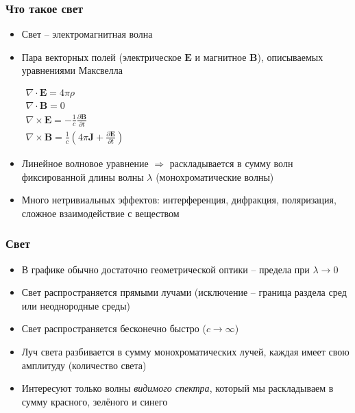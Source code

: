 \documentclass[10pt]{beamer}
\begin{document}
\begin{frame}[fragile]
\frametitle{Что такое свет}
\begin{itemize}
\item Свет -- электромагнитная волна
\pause
\item Пара векторных полей (электрическое \begin{math}\mathbf{E}\end{math} и магнитное \begin{math}\mathbf{B}\end{math}), описываемых уравнениями Максвелла
\begin{center}
\begin{math}
\begin{matrix}
\nabla \cdot \mathbf{E} = 4 \pi \rho \\
\nabla \cdot \mathbf{B} = 0 \\
\nabla \times \mathbf{E} = -\frac{1}{c} \frac{\partial \mathbf B}{\partial t} \\
\nabla \times \mathbf{B} = \frac{1}{c} \left(4 \pi \mathbf J + \frac{\partial \mathbf E}{\partial t} \right)
\end{matrix}
\end{math}
\end{center}
\pause
\item Линейное волновое уравнение \begin{math}\Longrightarrow\end{math} раскладывается в сумму волн фиксированной длины волны \begin{math}\lambda\end{math} (монохроматические волны)
\pause
\item Много нетривиальных эффектов: интерференция, дифракция, поляризация, сложное взаимодействие с веществом
\end{itemize}
\end{frame}

\begin{frame}[fragile]
\frametitle{Свет}
\begin{itemize}
\item В графике обычно достаточно геометрической оптики -- предела при \begin{math}\lambda\rightarrow 0\end{math}
\pause
\item Свет распространяется прямыми лучами (исключение -- граница раздела сред или неоднородные среды)
\pause
\item Свет распространяется бесконечно быстро (\begin{math}c \rightarrow \infty\end{math})
\pause
\item Луч света разбивается в сумму монохроматических лучей, каждая имеет свою амплитуду (количество света)
\pause
\item Интересуют только волны \textit{видимого спектра}, который мы раскладываем в сумму {\color{red}красного}, {\color{green}зелёного} и {\color{blue}синего}
\end{itemize}
\end{frame}
\end{document}
